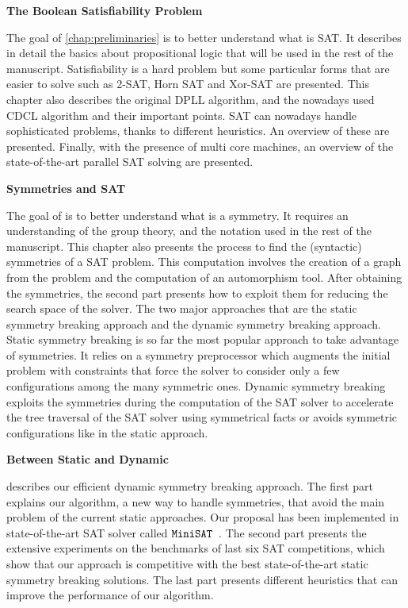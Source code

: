 \textbf{The Boolean Satisfiability Problem}

The goal of \cref{chap:preliminaries} is to better understand what is SAT. 
It describes in detail the basics
about propositional logic that will be used in the rest of the manuscript. Satisfiability is a hard
problem but some particular forms that are easier to solve such as 2-SAT, Horn SAT and Xor-SAT are presented.
This chapter also describes  the original DPLL algorithm, and the
nowadays used CDCL algorithm and their important points. SAT can nowadays handle
sophisticated problems, thanks to different heuristics.
 An overview of these are presented. Finally, with the presence of multi
core machines, an overview of the state-of-the-art parallel SAT solving are presented.


\textbf{Symmetries and SAT}

The goal of  is to better understand what is a symmetry. 
It requires an understanding of the group theory, and the notation used in the rest of the manuscript.
This chapter also presents the process to find the (syntactic) symmetries of a SAT problem.
 This computation involves the creation of a graph from the problem and the computation of an
automorphism tool. After obtaining the symmetries, the second part presents how to
exploit them for reducing the search space of the solver. The two major approaches that
are the static symmetry breaking approach and the dynamic symmetry breaking approach.
Static symmetry breaking is so far the most popular approach to take advantage of symmetries. It relies on a symmetry preprocessor which augments the initial problem with constraints that force the solver to consider only a few configurations among the many symmetric ones.
Dynamic symmetry breaking exploits the symmetries during the computation of the SAT solver to accelerate the
tree traversal of the SAT solver using symmetrical facts or avoids symmetric configurations like in the 
static approach.

\textbf{Between Static and Dynamic}

 describes our efficient dynamic symmetry breaking approach.
The first part explains our algorithm, a new way to handle symmetries, that avoid the main problem
of the current static approaches. Our proposal has been implemented in state-of-the-art
SAT solver called $\texttt{MiniSAT}$~\cite{een2003extensible}. The second part presents the extensive experiments on the benchmarks of last six SAT competitions,
which show that our approach is competitive with the best state-of-the-art static symmetry breaking solutions.
The last part presents different heuristics that can improve the performance of our algorithm.


